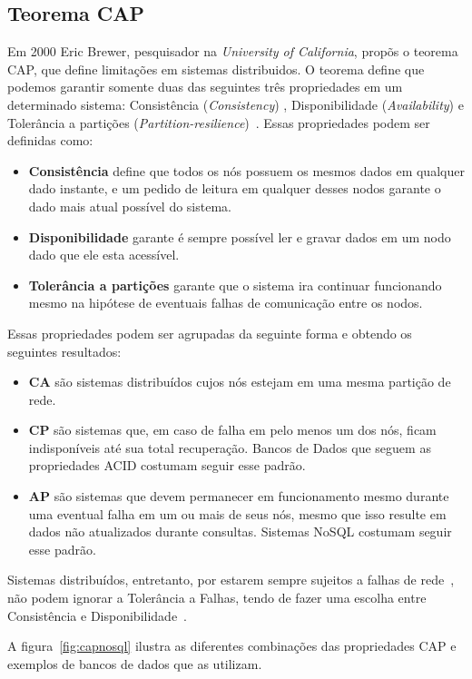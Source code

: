 \subsection{Teorema CAP}
\label{sec:cap}
	Em 2000 Eric Brewer, pesquisador na \emph{University of California}, propõs o teorema CAP, que define limitações em sistemas distribuidos. O teorema define que podemos garantir somente duas das seguintes três propriedades em um determinado sistema: Consistência (\emph{Consistency}) , Disponibilidade (\emph{Availability}) e Tolerância a partições (\emph{Partition-resilience})~\cite{brewer}. Essas propriedades podem ser definidas como:
    \begin{itemize}
	\item \textbf{Consistência} define que todos os nós possuem os mesmos dados em qualquer dado instante, e um pedido de leitura em qualquer desses nodos garante o dado mais atual possível do sistema.
    \item \textbf{Disponibilidade} garante é sempre possível ler e gravar dados em um nodo dado que ele esta acessível. 
    \item \textbf{Tolerância a partições} garante que o sistema ira continuar funcionando mesmo na hipótese de eventuais falhas de comunicação entre os nodos.
	\end{itemize}
	
    Essas propriedades podem ser agrupadas da seguinte forma e obtendo os seguintes resultados:
    \begin{itemize}
    \item \textbf{CA} são sistemas distribuídos cujos nós estejam em uma mesma partição de rede.
    \item \textbf{CP} são sistemas que, em caso de falha em pelo menos um dos nós, ficam indisponíveis até sua total recuperação. Bancos de Dados que seguem as propriedades ACID costumam seguir esse padrão.
    \item \textbf{AP} são sistemas que devem permanecer em funcionamento mesmo durante uma eventual falha em um ou mais de seus nós, mesmo que isso resulte em dados não atualizados durante consultas. Sistemas NoSQL costumam seguir esse padrão.  
	\end{itemize}
    
    Sistemas distribuídos, entretanto, por estarem sempre sujeitos a falhas de rede~\cite{deutsch}, não podem ignorar a Tolerância a Falhas, tendo de fazer uma escolha entre Consistência e Disponibilidade~\cite{brewer12years}.
    
    A figura~\ref{fig:capnosql} ilustra as diferentes combinações das propriedades CAP e exemplos de bancos de dados que as utilizam.
    
